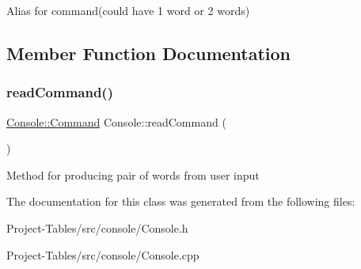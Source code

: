 Alias for command(could have 1 word or 2 words) 

\subsection{Member Function Documentation}
\mbox{\label{classConsole_ab4b82381e77a8641dca39301f5c36a3b}} 
\subsubsection{\texorpdfstring{read\+Command()}{readCommand()}}
{\footnotesize\ttfamily \hyperlink{classConsole_a02cf1ce14565d852415e41cce4861621}{Console\+::\+Command} Console\+::read\+Command (\begin{DoxyParamCaption}{ }\end{DoxyParamCaption})\hspace{0.3cm}{\ttfamily [static]}}

Method for producing pair of words from user input 

The documentation for this class was generated from the following files\+:\begin{DoxyCompactItemize}
\item 
Project-\/\+Tables/src/console/Console.\+h\item 
Project-\/\+Tables/src/console/Console.\+cpp\end{DoxyCompactItemize}
